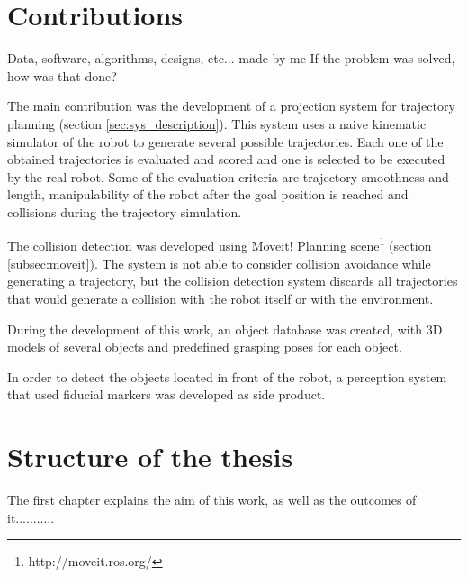\section{Contributions}
Data, software, algorithms, designs, etc... made by me
If the problem was solved, how was that done?

The main contribution was the development of a projection system for trajectory planning (section \ref{sec:sys_description}). This system uses a naive kinematic simulator of the robot to generate several possible trajectories. Each one of the obtained trajectories is evaluated and scored and one is selected to be executed by the real robot. Some of the evaluation criteria are trajectory smoothness and length, manipulability of the robot after the goal position is reached and collisions during the trajectory simulation.

The collision detection was developed using Moveit! Planning scene\footnote{http://moveit.ros.org/} (section \ref{subsec:moveit}). The system is not able to consider collision avoidance while generating a trajectory, but the collision detection system discards all trajectories that would generate a collision with the robot itself or with the environment.

During the development of this work, an object database was created, with 3D models of several objects and predefined grasping poses for each object.

In order to detect the objects located in front of the robot, a perception system that used fiducial markers was developed as side product.


\section{Structure of the thesis}

The first chapter explains the aim of this work, as well as the outcomes of it...........

